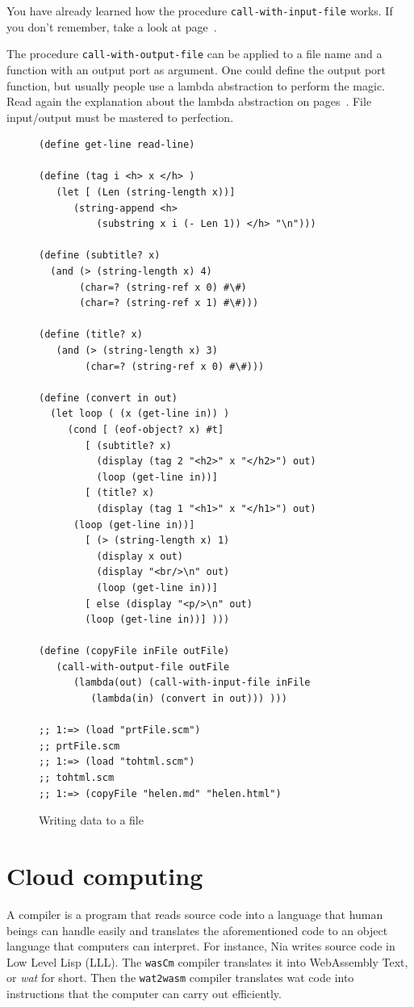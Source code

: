 \documentclass[a4paper,12pt]{book}
\begin{document}
You have already learned how the
procedure \verb|call-with-input-file| works.
If you don't remember, take a look at
page~\pageref{page:call-with-input-file}.

The procedure
\verb|call-with-output-file|
can be
applied to a file name and a function
with an output port as argument. One could
define the output port function, but
usually people use a lambda abstraction
to perform the magic. Read again the
explanation about the lambda abstraction
on pages~\pageref{page:lambda1}. File
input/output
must be mastered to perfection.

\begin{figure}[!h]
\begin{verbatim}
(define get-line read-line)

(define (tag i <h> x </h> )
   (let [ (Len (string-length x))]
      (string-append <h>
          (substring x i (- Len 1)) </h> "\n")))

(define (subtitle? x)
  (and (> (string-length x) 4)
       (char=? (string-ref x 0) #\#)
       (char=? (string-ref x 1) #\#)))

(define (title? x)
   (and (> (string-length x) 3)
        (char=? (string-ref x 0) #\#)))

(define (convert in out)
  (let loop ( (x (get-line in)) )
     (cond [ (eof-object? x) #t]
        [ (subtitle? x)
          (display (tag 2 "<h2>" x "</h2>") out)
          (loop (get-line in))]
        [ (title? x)
          (display (tag 1 "<h1>" x "</h1>") out)
	  (loop (get-line in))]
        [ (> (string-length x) 1)
          (display x out)
          (display "<br/>\n" out)
          (loop (get-line in))]
        [ else (display "<p/>\n" out)
	    (loop (get-line in))] )))

(define (copyFile inFile outFile)
   (call-with-output-file outFile
      (lambda(out) (call-with-input-file inFile
         (lambda(in) (convert in out))) )))

;; 1:=> (load "prtFile.scm")
;; prtFile.scm
;; 1:=> (load "tohtml.scm")
;; tohtml.scm
;; 1:=> (copyFile "helen.md" "helen.html")
\end{verbatim}

\caption{Writing data to a file}
\label{wrtFile}
\end{figure}



\chapter{Cloud computing}\label{cloud-computing}
A compiler is a program that reads
source code into a language that
human beings can handle easily
and translates the aforementioned
code to an object language that
computers can interpret.
For instance, Nia writes source code
in Low Level Lisp (LLL). The \verb|wasCm| compiler
translates it into WebAssembly Text, or {\em wat}
for short. Then the \verb|wat2wasm| compiler
translates wat code into instructions that the
computer can carry out efficiently.
\end{document}
